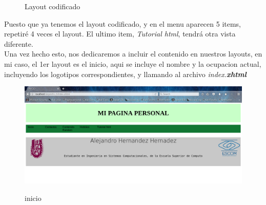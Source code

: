 \documentclass[12pt,letterpaper, spanish]{article}
\begin{document}
\begin{flushleft}
\begin{center}
\begin{figure}[h!]
\vspace{-10mm}
{\em{\caption {Layout codificado}}}\label{figura 2}
\end{figure}
\end{center}
\vspace{-1cm}
Puesto que ya tenemos el layout codificado, y en el menu aparecen 5 items, repetir\'e 4 veces el layout. El ultimo item, {\em Tutorial html}, tendr\'a otra vista diferente.\\
Una vez hecho esto, nos dedicaremos a incluir el contenido en nuestros layouts, en mi caso, el 1er layout es el inicio, aqui se incluye el nombre y la ocupacion actual, incluyendo los logotipos correspondientes, y llamando al archivo {\em index.}{\bf{\em xhtml}}
\begin{center}
\begin{figure}[h!]
\includegraphics[scale=0.3]{./imgs/inicio.png}
\vspace{-2cm}
{\em{\caption {inicio}}}\label{figura 3}
\end{figure}
\end{center}
\vspace{-1cm}


\end{flushleft}
\end{document}
